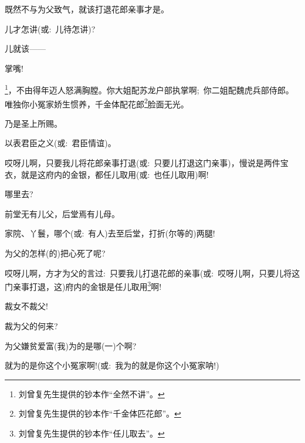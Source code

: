 {{既然不与为父致气，就该打退花郎亲事才是。}

{儿才怎讲({\akai 或}:~儿待怎讲)?}

{儿就该------}

{掌嘴!}

\footnote{刘曾复先生提供的钞本作``全然不讲''。}{，不由得年迈人怒满胸膛。你大姐配苏龙户部执掌啊;~你二姐配魏虎兵部侍郎。唯独你小冤家娇生惯养，千金体配花郎}\footnote{刘曾复先生提供的钞本作``千金体匹花郎''。}{脸面无光。}








{乃是圣上所赐。}

{以表君臣之义({\akai 或}:~君臣情谊)。}

{哎呀儿啊，只要我儿将花郎亲事打退({\akai 或}:~只要儿打退这门亲事)，慢说是两件宝衣，就是这府内的金银，都任儿取用({\akai 或}:~也任儿取用)啊!}

{哪里去?}

前堂无有儿父，后堂焉有儿母。

{家院、丫鬟，哪个({\akai 或}:~有人)去至后堂，打折(尔等的)两腿!}

{为父的怎样(的)把心死了呢?}

{哎呀儿啊，方才为父的言过:~只要我儿打退花郎的亲事({\akai 或}:~哎呀儿啊，只要儿将这门亲事打退，这)府内的金银是任儿取用}\footnote{刘曾复先生提供的钞本作``任儿取去''。}{啊!}

{裁女不裁父!}

{裁为父的何来?}

{为父嫌贫爱富(我)为的是哪(一)个啊?}

{就为的是你这个小冤家啊!({\akai 或}:~我为的就是你这个小冤家呐!)}

}
